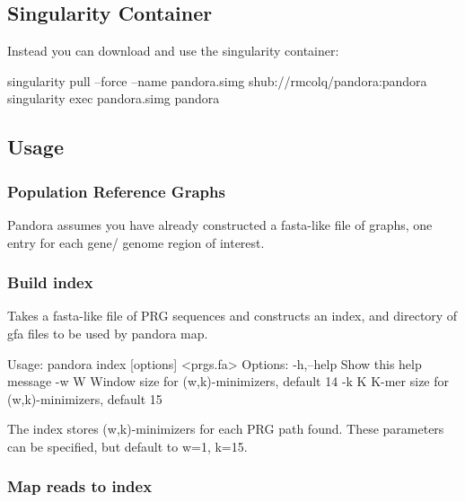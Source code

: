\subsection*{Singularity Container}

Instead you can download and use the singularity container\+: \begin{DoxyVerb}singularity pull --force --name pandora.simg shub://rmcolq/pandora:pandora
singularity exec pandora.simg pandora
\end{DoxyVerb}


\subsection*{Usage}

\subsubsection*{Population Reference Graphs}

Pandora assumes you have already constructed a fasta-\/like file of graphs, one entry for each gene/ genome region of interest.

\subsubsection*{Build index}

Takes a fasta-\/like file of P\+RG sequences and constructs an index, and directory of gfa files to be used by pandora map. \begin{DoxyVerb}  Usage: pandora index [options] <prgs.fa>
  Options:
    -h,--help           Show this help message
    -w W                Window size for (w,k)-minimizers, default 14
    -k K                K-mer size for (w,k)-minimizers, default 15
\end{DoxyVerb}


The index stores (w,k)-\/minimizers for each P\+RG path found. These parameters can be specified, but default to w=1, k=15.

\subsubsection*{Map reads to index}

